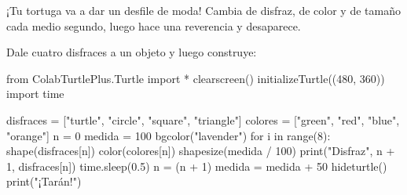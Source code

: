 
¡Tu tortuga va a dar un desfile de moda! Cambia de disfraz, de color y de tamaño cada medio segundo, luego hace una reverencia y desaparece.

Dale cuatro disfraces a un objeto y luego construye:

\begin{center}
\begin{scratch}
\end{scratch}
\end{center}


\begin{typethis}
from ColabTurtlePlus.Turtle import *
clearscreen()
initializeTurtle((480, 360))
import time

disfraces = ["turtle", "circle", "square", "triangle"]
colores = ["green", "red", "blue", "orange"]
n = 0
medida = 100
bgcolor("lavender")
for i in range(8):
    shape(disfraces[n])
    color(colores[n])
    shapesize(medida / 100)
    print("Disfraz", n + 1, disfraces[n])
    time.sleep(0.5)
    n = (n + 1) %
    medida = medida + 50
hideturtle()
print("¡Tarán!")
\end{typethis}



